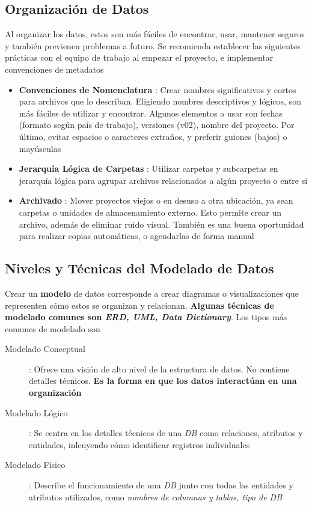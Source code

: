 \subsection{Organización de Datos}
Al organizar los datos, estos son más fáciles de encontrar, usar, mantener seguros y también previenen problemas a futuro. Se recomienda establecer las siguientes prácticas con el equipo de trabajo al empezar el proyecto, e implementar convenciones de metadatos
\begin{itemize}
    \item {\textbf{Convenciones de Nomenclatura} : Crear nombres significativos y cortos para archivos que lo describan. Eligiendo nombres descriptivos y lógicos, son más fáciles de utilizar y encontrar. Algunos elementos a usar son fechas (formato según país de trabajo), versiones (v02), nombre del proyecto. Por último, evitar espacios o caracteres extraños, y preferir guiones (bajos) o mayúsculas}
    \item {\textbf{Jerarquía Lógica de Carpetas} : Utilizar carpetas y subcarpetas en jerarquía lógica para agrupar archivos relacionados a algún proyecto o entre si}
    \item {\textbf{Archivado} : Mover proyectos viejos o en desuso a otra ubicación, ya sean carpetas o unidades de almacenamiento externo. Esto permite crear un archivo, además de eliminar ruido visual. También es una buena oportunidad para realizar copias automáticas, o agendarlas de forma manual}
\end{itemize}

\subsection{Niveles y Técnicas del Modelado de Datos}
Crear un \textbf{modelo} de datos corresponde a crear diagramas o visualizaciones que representen cómo estos se organizan y relacionan. \textbf{Algunas técnicas de modelado comunes son \textit{ERD, UML, Data Dictionary}}. Los tipos más comunes de modelado son 
\begin{description}
    \item[Modelado Conceptual]{ : Ofrece una visión de alto nivel de la estructura de datos. No contiene detalles técnicos. \textbf{Es la forma en que los datos interactúan en una organización}}
    \item[Modelado Lógico]{ : Se centra en los detalles técnicos de una \textit{DB} como relaciones, atributos y entidades, inlcuyendo cómo identificar registros individuales}
    \item[Modelado Físico]{ : Describe el funcionamiento de una \textit{DB} junto con todas las entidades y atributos utilizados, como \textit{ nombres de columnas y tablas, tipo de DB}} 
\end{description}

